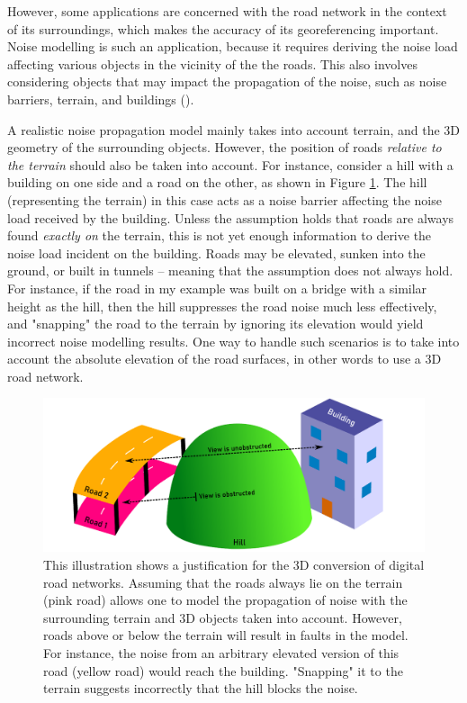 However, some applications are concerned with the road network in the context of its surroundings, which makes the accuracy of its georeferencing important. Noise modelling is such an application, because it requires deriving the noise load affecting various objects in the vicinity of the the roads. This also involves considering objects that may impact the propagation of the noise, such as noise barriers, terrain, and buildings (\cite{ishiyama_etal_1991, bennett_1997, guarnaccia_quartieri_2012}).

A realistic noise propagation model mainly takes into account terrain, and the 3D geometry of the surrounding objects. However, the position of roads \textit{relative to the terrain} should also be taken into account. For instance, consider a hill with a building on one side and a road on the other, as shown in Figure \ref{fig:justification_illu}. The hill (representing the terrain) in this case acts as a noise barrier affecting the noise load received by the building. Unless the assumption holds that roads are always found \textit{exactly on} the terrain, this is not yet enough information to derive the noise load incident on the building. Roads may be elevated, sunken into the ground, or built in tunnels – meaning that the assumption does not always hold. For instance, if the road in my example was built on a bridge with a similar height as the hill, then the hill suppresses the road noise much less effectively, and "snapping" the road to the terrain by ignoring its elevation would yield incorrect noise modelling results. One way to handle such scenarios is to take into account the absolute elevation of the road surfaces, in other words to use a 3D road network.

\begin{figure}
    \centering
    \includegraphics[width=\linewidth]{final_report/figs/justification_illu.pdf}
    \caption[Illustration of the 3D conversion justification]{This illustration shows a justification for the 3D conversion of digital road networks. Assuming that the roads always lie on the terrain (pink road) allows one to model the propagation of noise with the surrounding terrain and 3D objects taken into account. However, roads above or below the terrain will result in faults in the model. For instance, the noise from an arbitrary elevated version of this road (yellow road) would reach the building. "Snapping" it to the terrain suggests incorrectly that the hill blocks the noise.}
    \label{fig:justification_illu}
\end{figure}

